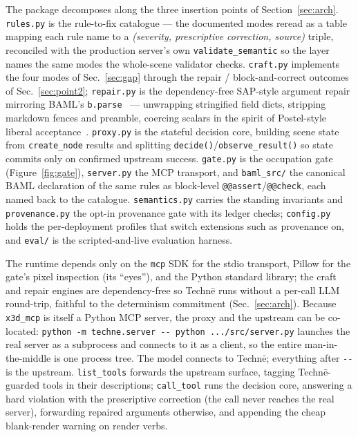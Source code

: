 \documentclass[sigconf,nonacm,screen,anonymous]{acmart}
\begin{document}
The package decomposes along the three insertion points of Section~\ref{sec:arch}. \texttt{rules.py} is the rule-to-fix catalogue --- the documented modes reread as a table mapping each rule name to a \emph{(severity, prescriptive correction, source)} triple, reconciled with the production server's own \texttt{validate\_semantic} so the layer names the same modes the whole-scene validator checks. \texttt{craft.py} implements the four modes of Sec.~\ref{sec:gap} through the repair / block-and-correct outcomes of Sec.~\ref{sec:point2}; \texttt{repair.py} is the dependency-free SAP-style argument repair mirroring BAML's \texttt{b.parse}~\cite{baml} --- unwrapping stringified field dicts, stripping markdown fences and preamble, coercing scalars in the spirit of Postel-style liberal acceptance~\cite{postel}. \texttt{proxy.py} is the stateful decision core, building scene state from \texttt{create\_node} results and splitting \texttt{decide()}/\texttt{observe\_result()} so state commits only on confirmed upstream success. \texttt{gate.py} is the occupation gate (Figure~\ref{fig:gate}), \texttt{server.py} the MCP transport, and \texttt{baml\_src/} the canonical BAML declaration of the same rules as block-level \texttt{@@assert}/\texttt{@@check}, each named back to the catalogue. \texttt{semantics.py} carries the standing invariants and \texttt{provenance.py} the opt-in provenance gate with its ledger checks; \texttt{config.py} holds the per-deployment profiles that switch extensions such as provenance on, and \texttt{eval/} is the scripted-and-live evaluation harness.

The runtime depends only on the \texttt{mcp} SDK for the stdio transport, Pillow for the gate's pixel inspection (its ``eyes''), and the Python standard library; the craft and repair engines are dependency-free so Techn\=e runs without a per-call LLM round-trip, faithful to the determinism commitment (Sec.~\ref{sec:arch}). Because \texttt{x3d\_mcp} is itself a Python MCP server, the proxy and the upstream can be co-located: \texttt{python -m techne.server -{}- python .../src/server.py} launches the real server as a subprocess and connects to it as a client, so the entire man-in-the-middle is one process tree. The model connects to Techn\=e; everything after \texttt{-{}-} is the upstream. \texttt{list\_tools} forwards the upstream surface, tagging Techn\=e-guarded tools in their descriptions; \texttt{call\_tool} runs the decision core, answering a hard violation with the prescriptive correction (the call never reaches the real server), forwarding repaired arguments otherwise, and appending the cheap blank-render warning on render verbs.
\end{document}
